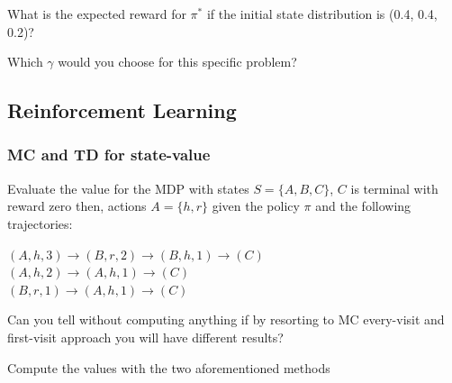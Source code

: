     What is the expected reward for $\pi^*$ if the initial state distribution is (0.4, 0.4, 0.2)?


    Which $\gamma$ would you choose for this specific problem?


\subsection{Reinforcement Learning}
\subsubsection{MC and TD for state-value}
    Evaluate the value for the MDP with states $S=\{A,B,C\}$, $C$ is terminal with reward zero then, actions $A=\{h,r\}$ given the policy $\pi$ and the following trajectories:

    \vspace{1em}
    $(A,h,3)\rightarrow(B,r,2)\rightarrow(B,h,1)\rightarrow(C)$\\
    $(A,h,2)\rightarrow(A,h,1)\rightarrow(C)$\\
    $(B,r,1)\rightarrow(A,h,1)\rightarrow(C)$
    
    \vspace{1em}
    Can you tell without computing anything if by resorting to MC every-visit and first-visit approach you will have different results?


    Compute the values with the two aforementioned methods


